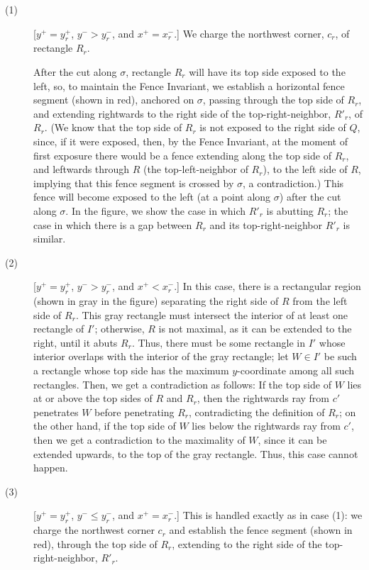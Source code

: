 \documentclass{article}
\begin{document}
\begin{description}
\item[(1)] [$y^+=y^+_r$, $y^-> y^-_r$, and $x^+=x^-_r$.] We charge the
  northwest corner, $c_r$, of rectangle $R_r$.

  After the cut along $\sigma$, rectangle $R_r$ will have its top side
  exposed to the left, so, to maintain the Fence Invariant, we
  establish a horizontal fence segment (shown in red), anchored on
  $\sigma$, passing through the top side of $R_r$, and extending
  rightwards to the right side of the top-right-neighbor, $R'_r$, of
  $R_r$.  (We know that the top side of $R_r$ is not exposed to the
  right side of $Q$, since, if it were exposed, then, by the Fence
  Invariant, at the moment of first exposure there would be a fence
  extending along the top side of $R_r$, and leftwards through $R$
  (the top-left-neighbor of $R_r$), to the left side of $R$, implying
  that this fence segment is crossed by $\sigma$, a contradiction.)
  This fence will become exposed to the left (at a point along
  $\sigma$) after the cut along $\sigma$.  In the figure, we show the
  case in which $R'_r$ is abutting $R_r$; the case in which there is a
  gap between $R_r$ and its top-right-neighbor $R'_r$ is similar.

\item[(2)] [$y^+=y^+_r$, $y^-> y^-_r$, and $x^+<x^-_r$.]  In this
  case, there is a rectangular region (shown in gray in the figure)
  separating the right side of $R$ from the left side of $R_r$. This
  gray rectangle must intersect the interior of at least one rectangle
  of $I'$; otherwise, $R$ is not maximal, as it can be extended to the
  right, until it abuts $R_r$. Thus, there must be some rectangle in
  $I'$ whose interior overlaps with the interior of the gray
  rectangle; let $W\in I'$ be such a rectangle whose top side has the
  maximum $y$-coordinate among all such rectangles. Then, we get a
  contradiction as follows: If the top side of $W$ lies at or above
  the top sides of $R$ and $R_r$, then the rightwards ray from $c'$
  penetrates $W$ before penetrating $R_r$, contradicting the
  definition of $R_r$; on the other hand, if the top side of $W$ lies
  below the rightwards ray from $c'$, then we get a contradiction to
  the maximality of $W$, since it can be extended upwards, to the top
  of the gray rectangle.  Thus, this case cannot happen.
 
\item[(3)] [$y^+=y^+_r$, $y^-\leq y^-_r$, and $x^+=x^-_r$.] This is
  handled exactly as in case (1): we charge the northwest corner $c_r$
  and establish the fence segment (shown in red), through the top side
  of $R_r$, extending to the right side of the top-right-neighbor, $R'_r$.


\end{description}
\end{document}
